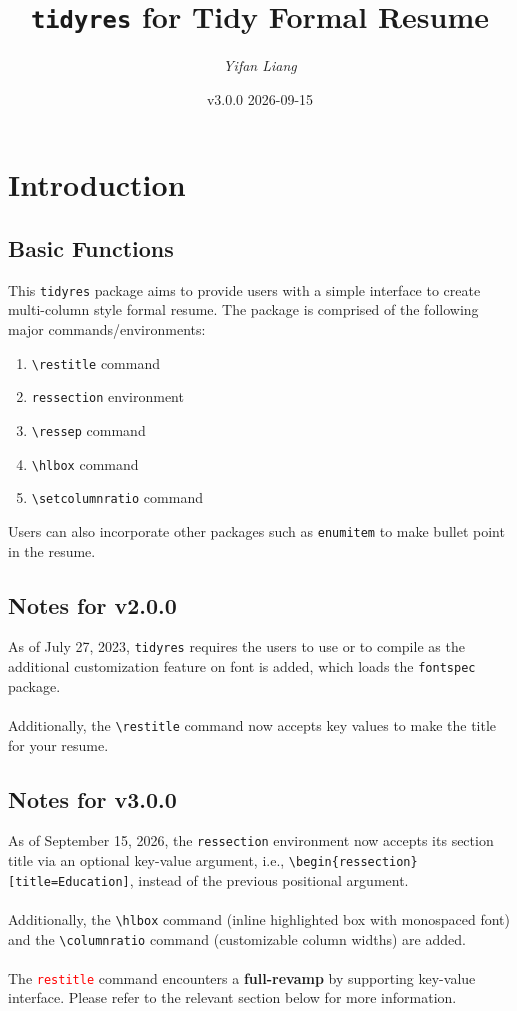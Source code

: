 \documentclass[a4paper, 10pt]{article}
\title{{\tt tidyres} for Tidy Formal Resume}
\author{\itshape Yifan Liang}
\date{v3.0.0 2026-09-15}
\begin{document}
\maketitle
\tableofcontents
\thispagestyle{empty}

\newpage
\setcounter{page}{1}
\pagestyle{plain}

\section{Introduction}

\subsection{Basic Functions}
This {\tt tidyres} package aims to provide users with a simple interface to create
multi-column style formal resume. The package is comprised of the following
major commands/environments:

\begin{enumerate}[label = \textbullet, leftmargin = 6ex, topsep = 4ex]
    \item \verb+\restitle+ command
    \item \verb+ressection+ environment
    \item \verb+\ressep+ command
    \item \verb+\hlbox+ command
    \item \verb+\setcolumnratio+ command
\end{enumerate}

Users can also incorporate other packages such as \verb+enumitem+ to make
bullet point in the resume.

\subsection{Notes for v2.0.0}
As of July 27, 2023, {\tt tidyres} requires the users to use 
or  to compile as the additional customization feature on font
is added, which loads the {\tt fontspec} package.\\
\\
Additionally, the \verb+\restitle+ command now accepts key values to make the
title for your resume.

\subsection{Notes for v3.0.0}
As of September 15, 2026, the \verb+ressection+ environment now accepts its
section title via an optional key-value argument, i.e.,
\verb+\begin{ressection}[title=Education]+, instead of the previous positional
argument.\\
\\
Additionally, the \verb+\hlbox+ command (inline highlighted box with monospaced
font) and the \verb+\columnratio+ command (customizable column widths) are
added.\\
\\
The \textcolor{red}{\tt restitle} command encounters a {\bf full-revamp} by
supporting key-value interface. Please refer to the relevant section below for
more information.
\end{document}
